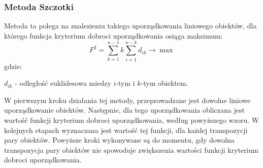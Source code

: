 \documentclass[12pt,a4paper]{report}
\begin{document}
\subsubsection{Metoda Szczotki}


Metoda ta polega na znalezieniu takiego uporządkowania liniowego obiektów, dla którego funkcja kryterium dobroci uporządkowania osiąga maksimum:
$$
F^{2}=\sum_{k=1}^{n-1} k\sum_{i=1}^{n-k} d_{ik} \rightarrow     \max  
$$
gdzie:

$d_{ik}$ - odległość euklidesowa miedzy $i$-tym i $k$-tym obiektem.

W pierwszym kroku działania tej metody, przeprowadzane jest dowolne liniowe uporządkowanie obiektów. Następnie, dla tego uporządkowania obliczana jest wartość funkcji kryterium dobroci uporządkowania, według powyższego wzoru. W kolejnych etapach wyznaczana jest wartość tej funkcji, dla każdej transpozycji pary obiektów. Powyższe kroki wykonywane są do momentu, gdy dowolna transpozycja pary obiektów nie spowoduje zwiększenia wartości funkcji kryterium dobroci uporządkowania. 
\end{document}
